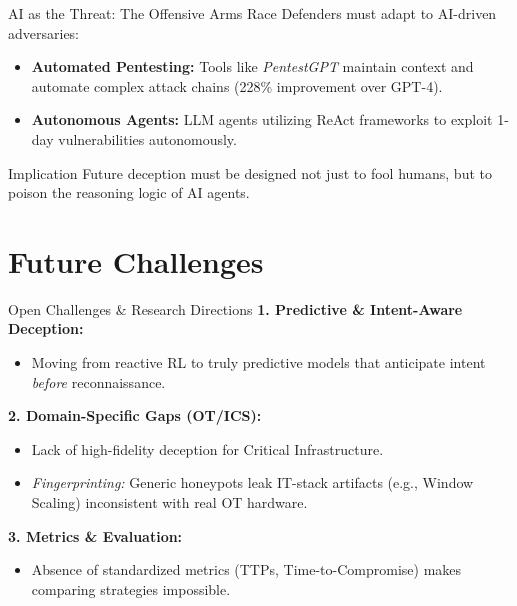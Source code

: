 \documentclass[12pt, aspectratio=169]{beamer}
\begin{document}
\begin{frame}{AI as the Threat: The Offensive Arms Race}
    Defenders must adapt to AI-driven adversaries:

    \begin{itemize}
        \item \textbf{Automated Pentesting:} Tools like \textit{PentestGPT} maintain context and automate complex attack chains (228\% improvement over GPT-4).
        \item \textbf{Autonomous Agents:} LLM agents utilizing ReAct frameworks to exploit 1-day vulnerabilities autonomously.
    \end{itemize}

    \vspace{0.5cm}
    \begin{alertblock}{Implication}
        Future deception must be designed not just to fool humans, but to poison the reasoning logic of AI agents.
    \end{alertblock}
\end{frame}

\section{Future Challenges}
\begin{frame}{Open Challenges \& Research Directions}
    \textbf{1. Predictive \& Intent-Aware Deception:}
    \begin{itemize}
        \item Moving from reactive RL to truly predictive models that anticipate intent \textit{before} reconnaissance.
    \end{itemize}

    \textbf{2. Domain-Specific Gaps (OT/ICS):}
    \begin{itemize}
        \item Lack of high-fidelity deception for Critical Infrastructure.
        \item \textit{Fingerprinting:} Generic honeypots leak IT-stack artifacts (e.g., Window Scaling) inconsistent with real OT hardware.
    \end{itemize}

    \textbf{3. Metrics \& Evaluation:}
    \begin{itemize}
        \item Absence of standardized metrics (TTPs, Time-to-Compromise) makes comparing strategies impossible.
    \end{itemize}
\end{frame}
\end{document}
